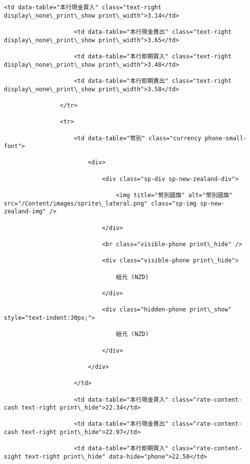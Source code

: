 \documentclass[11pt]{article}
\begin{document}
\begin{Verbatim}[commandchars=\\\{\}]
                    <td data-table="本行現金買入" class="text-right display\_none\_print\_show print\_width">3.14</td>

                    <td data-table="本行現金賣出" class="text-right display\_none\_print\_show print\_width">3.65</td>

                    <td data-table="本行即期買入" class="text-right display\_none\_print\_show print\_width">3.48</td>

                    <td data-table="本行即期賣出" class="text-right display\_none\_print\_show print\_width">3.58</td>

                </tr>

                <tr>

                    <td data-table="幣別" class="currency phone-small-font">

                        <div>

                            <div class="sp-div sp-new-zealand-div">

                                <img title="幣別國旗" alt="幣別國旗" src="/Content/images/sprite\_lateral.png" class="sp-img sp-new-zealand-img" />

                            </div>

                            <br class="visible-phone print\_hide" />

                            <div class="visible-phone print\_hide">

                                紐元 (NZD)

                            </div>

                            <div class="hidden-phone print\_show" style="text-indent:30px;">

                                紐元 (NZD)

                            </div>

                        </div>

                    </td>

                    <td data-table="本行現金買入" class="rate-content-cash text-right print\_hide">22.34</td>

                    <td data-table="本行現金賣出" class="rate-content-cash text-right print\_hide">22.97</td>

                    <td data-table="本行即期買入" class="rate-content-sight text-right print\_hide" data-hide="phone">22.58</td>


\end{Verbatim}
\end{document}
